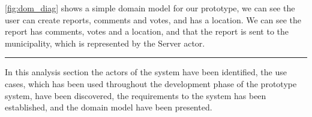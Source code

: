 \autoref{fig:dom_diag} shows a simple domain model for our prototype, we can see the user can create reports, comments and votes, and has a location. We can see the report has comments, votes and a location, and that the report is sent to the municipality, which is represented by the Server actor.

\vspace{3em}
\hrule
In this analysis section the actors of the system have been identified, the use cases, which has been used throughout the development phase of the prototype system, have been discovered, the requirements to the system has been established, and the domain model have been presented.